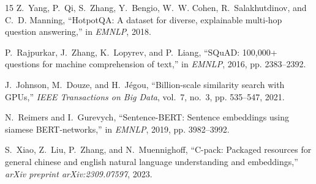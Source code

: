 \documentclass[conference]{IEEEtran}
\begin{document}
\begin{thebibliography}{15}
Z.~Yang, P.~Qi, S.~Zhang, Y.~Bengio, W.~W. Cohen, R.~Salakhutdinov, and C.~D. Manning, ``{HotpotQA}: A dataset for diverse, explainable multi-hop question answering,'' in \emph{EMNLP}, 2018.

P.~Rajpurkar, J.~Zhang, K.~Lopyrev, and P.~Liang, ``{SQuAD}: 100,000+ questions for machine comprehension of text,'' in \emph{EMNLP}, 2016, pp. 2383--2392.

J.~Johnson, M.~Douze, and H.~J{\'e}gou, ``Billion-scale similarity search with {GPUs},'' \emph{IEEE Transactions on Big Data}, vol.~7, no.~3, pp. 535--547, 2021.

N.~Reimers and I.~Gurevych, ``{Sentence-BERT}: Sentence embeddings using siamese {BERT}-networks,'' in \emph{EMNLP}, 2019, pp. 3982--3992.

S.~Xiao, Z.~Liu, P.~Zhang, and N.~Muennighoff, ``C-pack: Packaged resources for general chinese and english natural language understanding and embeddings,'' \emph{arXiv preprint arXiv:2309.07597}, 2023.

\end{thebibliography}
\end{document}

